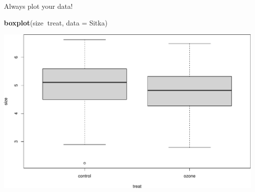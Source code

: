 \documentclass[
  ignorenonframetext,
]{beamer}
\newenvironment{Shaded}{\begin{snugshade}}{\end{snugshade}}
\newcommand{\DataTypeTok}[1]{\textcolor[rgb]{0.13,0.29,0.53}{#1}}
\newcommand{\KeywordTok}[1]{\textcolor[rgb]{0.13,0.29,0.53}{\textbf{#1}}}
\newcommand{\NormalTok}[1]{#1}
\newcommand{\OperatorTok}[1]{\textcolor[rgb]{0.81,0.36,0.00}{\textbf{#1}}}
\begin{document}
\begin{frame}[fragile]{Always plot your data!}
\protect\hypertarget{always-plot-your-data}{}

\begin{Shaded}
\begin{Highlighting}[]
\KeywordTok{boxplot}\NormalTok{(size}\OperatorTok{~}\NormalTok{treat, }\DataTypeTok{data =}\NormalTok{ Sitka)}
\end{Highlighting}
\end{Shaded}

\includegraphics{review_files/figure-beamer/unnamed-chunk-10-1.pdf}

\end{frame}
\end{document}
